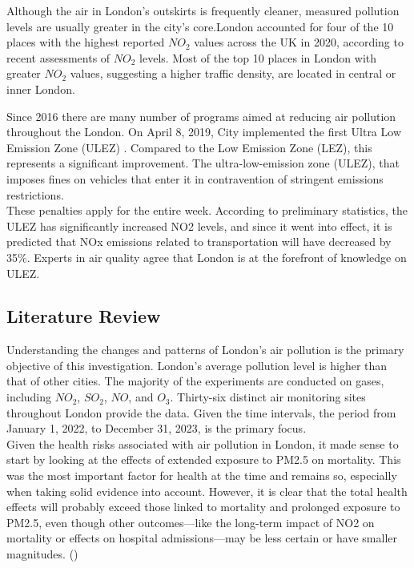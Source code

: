 \documentclass{article}
\begin{document}
	Although the air in London's outskirts is frequently cleaner, measured pollution levels are usually greater in the city's core.London accounted for four of the 10 places with the highest reported $NO_2$ values across the UK in 2020, according to recent assessments of $NO_2$ levels. Most of the top 10 places in London with greater $NO_2$ values, suggesting a higher traffic density, are located in central or inner London.
	
	 Since 2016 there are many number of programs aimed at reducing air pollution throughout the London. On April 8, 2019, City implemented the first Ultra Low Emission Zone (ULEZ) . Compared to the Low Emission Zone (LEZ), this represents a significant improvement. The ultra-low-emission zone (ULEZ), that imposes fines on vehicles that enter it in contravention of stringent emissions restrictions. \\
	
	These penalties apply for the entire week. According to preliminary statistics, the ULEZ has significantly increased NO2 levels, and since it went into effect, it is predicted that NOx emissions related to transportation will have decreased by 35\%. Experts in air quality agree that London is at the forefront of knowledge on ULEZ.
	
	\newpage
	

	\begin{center}
		\section{Literature Review}
	\end{center}
	
	Understanding the changes and patterns of London's air pollution is the primary objective of this investigation. London's average pollution level is higher than that of other cities. The majority of the experiments are conducted on gases, including $NO_2$, $SO_2$, $NO$, and $O_3$. Thirty-six distinct air monitoring sites throughout London provide the data. Given the time intervals, the period from January 1, 2022, to December 31, 2023, is the primary focus. 
	\\
	
	Given the health risks associated with air pollution in London, it made sense to start by looking at the effects of extended exposure to PM2.5 on mortality. This was the most important factor for health at the time and remains so, especially when taking solid evidence into account. However, it is clear that the total health effects will probably exceed those linked to mortality and prolonged exposure to PM2.5, even though other outcomes—like the long-term impact of NO2 on mortality or effects on hospital admissions—may be less certain or have smaller magnitudes.
	(\textcite{health}) \\
	
\end{document}
